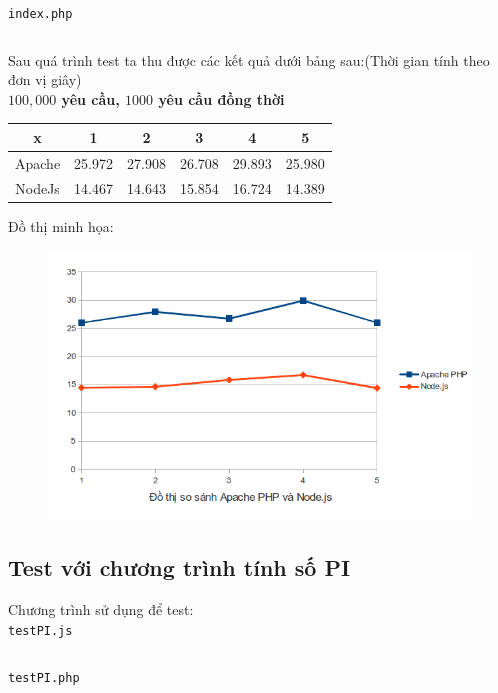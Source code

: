\texttt{index.php}
	\begin{framed}
		\inputminted[tabsize=4,linenos=true]{php}{index.php}
	\end{framed}

Sau quá trình test ta thu được các kết quả dưới bảng sau:(Thời gian tính theo đơn vị giây)\\
\textbf{$100,000$ yêu cầu, $1000$ yêu cầu đồng thời} \\
	\begin{tabular}{|c|c|c|c|c|c|}
		\hline
		x & 1 & 2 & 3 & 4 & 5 \\
		\hline
		Apache & 25.972 & 27.908 & 26.708 & 29.893 & 25.980 \\
		\hline
		NodeJs & 14.467 & 14.643 & 15.854 & 16.724 & 14.389
		\\ \hline
	\end{tabular}
\newpage

Đồ thị minh họa:\\
	\begin{figure}[-h]
		\centering
		\includegraphics[scale=0.6]{1_1.png}
	\end{figure}

\subsection{Test với chương trình tính số PI}
	Chương trình sử dụng để test:\\
\texttt{testPI.js}
		\begin{framed}
			\inputminted[tabsize=4, linenos=true]{javascript}{testPI.js}
		\end{framed}

\texttt{testPI.php}
		\begin{framed}
			\inputminted[tabsize=4, linenos=true]{php}{testPi.php}
		\end{framed}

